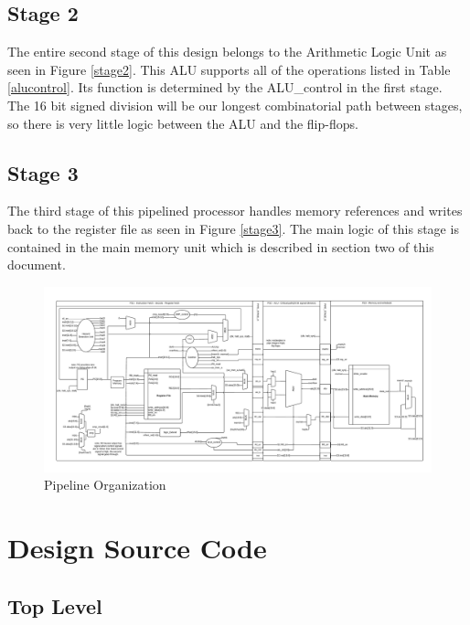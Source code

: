     \subsection{Stage 2}
    The entire second stage of this design belongs to the Arithmetic Logic Unit as seen in Figure
    \ref{stage2}. This ALU supports all of the operations listed in Table \ref{alucontrol}. Its function is 
    determined by the ALU\_control in the first stage. The 16 bit signed division will be our longest combinatorial path between stages, so there is very little logic between the ALU and the flip-flops.  
    
	
    \subsection{Stage 3}
    The third stage of this pipelined processor handles memory references and writes back to the
    register file as seen in Figure \ref{stage3}. The main logic of this stage is contained in the 
    main memory unit which is described in section two of this document.
    \FloatBarrier
    \newpage  
    \begin{figure}[htpb]
        \centering
        \includegraphics[angle=90,width=.68\textwidth]{./figures/142.pdf}
        \caption{Pipeline Organization}
        \label{fullschematic}
    \end{figure}
    \FloatBarrier

    \onecolumn
    \section{Design Source Code}
        \subsection{Top Level}
        
        
